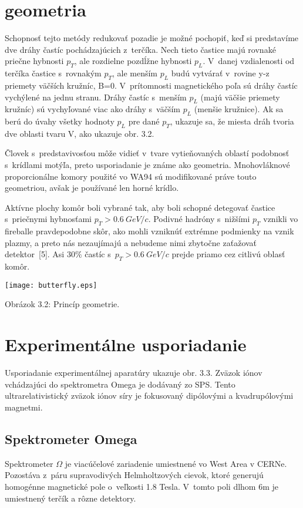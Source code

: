 \section{ geometria}
Schopnosť tejto metódy redukovať pozadie je možné pochopiť, keď si
predstavíme dve dráhy častíc pochádzajúcich z~terčíka. Nech tieto
častice majú rovnaké priečne hybnosti $p_{T}$, ale rozdielne pozdĺžne
hybnosti $p_{L}$. V~danej vzdialenosti od terčíka častice s~rovnakým
$p_{T}$, ale menším  $p_{L}$ budú vytvárať v~rovine y-z priemety
väčších kružníc, B=0. V~prítomnosti magnetického poľa sú dráhy častíc
vychýlené na jednu stranu. Dráhy častíc s~menším  $p_{L}$ (majú väčšie
priemety kružníc) sú vychyľované viac ako dráhy s~väčším  $p_{L}$ 
(menšie kružnice). Ak sa berú do úvahy všetky hodnoty  $p_{L}$ pre dané 
$p_{T}$, ukazuje sa, že miesta dráh tvoria dve oblasti tvaru V, ako
ukazuje obr. 3.2.

Človek s~predstavivosťou môže vidieť v~tvare vytieňovaných oblastí podobnosť
s~krídlami motýľa, preto usporiadanie  je známe ako  geometria.
Mnohovláknové proporcionálne komory použité vo WA94 sú modifikované práve
touto geometriou, avšak je používané len horné krídlo. 

Aktívne plochy komôr boli vybrané tak, aby boli schopné detegovať častice 
s~priečnymi hybnosťami $p_{T}>0.6\: GeV/c$. Podivné hadróny s~nižšími $p_{T}$
vznikli vo fireballe pravdepodobne skôr, ako mohli vzniknúť 
extrémne podmienky na vznik plazmy, a preto nás nezaujímajú a nebudeme nimi
zbytočne zaťažovať detektor~[5]. Asi $30\%$ častíc s~$p_{T}>0.6\: GeV/c$
prejde priamo cez citlivú oblasť komôr.


\newpage
\vspace*{1cm}
\begin{center}
  \texttt{[image: butterfly.eps]}
\end{center}
\begin{center}
  Obrázok 3.2: Princíp  geometrie.
\end{center}

\newpage
\section{Experimentálne usporiadanie}
Usporiadanie experimentálnej aparatúry ukazuje obr. 3.3. Zväzok iónov
vchádzajúci do spektrometra Omega je dodávaný zo SPS.
Tento  ultrarelativistický zväzok 
iónov síry je fokusovaný dipólovými a kvadrupólovými magnetmi.
\subsection{Spektrometer Omega}
Spektrometer ${\Omega}$ je viacúčelové zariadenie umiestnené vo West Area v
CERNe.  Pozostáva  z~páru supravodivých Helmholtzových cievok, ktoré generujú
homogénne magnetické pole o~veľkosti 1.8 Tesla. V~tomto poli dlhom 6m je
umiestnený terčík a rôzne detektory.  

